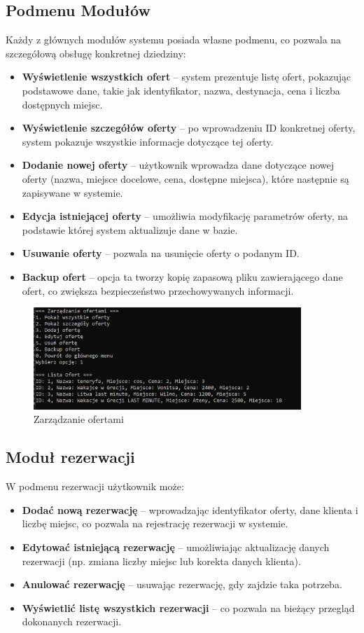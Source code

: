 \subsection{Podmenu Modułów}
Każdy z głównych modułów systemu posiada własne podmenu, co pozwala na szczegółową obsługę konkretnej dziedziny:
\begin{itemize}
    \item \textbf{Wyświetlenie wszystkich ofert} – system prezentuje listę ofert, pokazując podstawowe dane, takie jak identyfikator, nazwa, destynacja, cena i liczba dostępnych miejsc.
    \item \textbf{Wyświetlenie szczegółów oferty} – po wprowadzeniu ID konkretnej oferty, system pokazuje wszystkie informacje dotyczące tej oferty.
    \item \textbf{Dodanie nowej oferty} – użytkownik wprowadza dane dotyczące nowej oferty (nazwa, miejsce docelowe, cena, dostępne miejsca), które następnie są zapisywane w systemie.
    \item \textbf{Edycja istniejącej oferty} – umożliwia modyfikację parametrów oferty, na podstawie której system aktualizuje dane w bazie.
    \item \textbf{Usuwanie oferty} – pozwala na usunięcie oferty o podanym ID.
    \item \textbf{Backup ofert} – opcja ta tworzy kopię zapasową pliku zawierającego dane ofert, co zwiększa bezpieczeństwo przechowywanych informacji.
\end{itemize}

\begin{figure}[htbp]
  \centering
  \includegraphics[width=0.9\textwidth]{figures/lista_ofert.jpg} 
  \caption{Zarządzanie ofertami}
  \label{fig:obrazek}
\end{figure}

\subsection{Moduł rezerwacji}
W podmenu rezerwacji użytkownik może:
\begin{itemize}
    \item \textbf{Dodać nową rezerwację} – wprowadzając identyfikator oferty, dane klienta i liczbę miejsc, co pozwala na rejestrację rezerwacji w systemie.
    \item \textbf{Edytować istniejącą rezerwację} – umożliwiając aktualizację danych rezerwacji (np. zmiana liczby miejsc lub korekta danych klienta).
    \item \textbf{Anulować rezerwację} – usuwając rezerwację, gdy zajdzie taka potrzeba.
    \item \textbf{Wyświetlić listę wszystkich rezerwacji} – co pozwala na bieżący przegląd dokonanych rezerwacji.
\end{itemize}
\newpage
